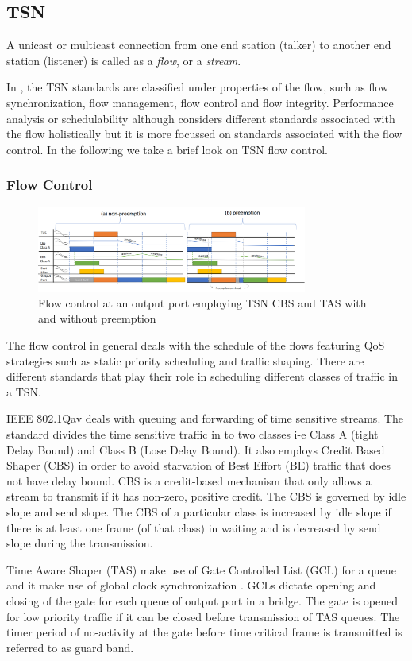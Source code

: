\documentclass[journal,12pt,twocolumn]{IEEEtran}
\begin{document}
\subsection{TSN}
A unicast or multicast connection from one end station (talker) to another end station (listener) is called as a \emph {flow}, or a \emph {stream}.

In \cite{ULL}, the TSN standards are classified under properties of the flow, such as flow synchronization, flow management, flow control and flow integrity. Performance analysis or schedulability although considers different standards associated with the flow holistically but it is more focussed on standards associated with the flow control. In the following we take a brief look on TSN flow control.
\subsubsection{Flow Control}
\begin{figure}
\centering
\includegraphics[width=3.5in]{TSNFlowControl}
\caption{Flow control at an output port employing TSN CBS and TAS with and without preemption}
\label{TSN_FlowControl}
\end{figure}
The flow control in general deals with the schedule of the flows featuring QoS strategies such as static priority scheduling and traffic shaping. There are different standards that play their role in scheduling different classes of traffic in a TSN.

IEEE 802.1Qav \cite{IEEE802.1Qav} deals with queuing and forwarding of time sensitive streams. The standard divides the time sensitive traffic in to two classes i-e Class A (tight Delay Bound) and Class B (Lose Delay Bound). It also employs Credit Based Shaper (CBS) in order to avoid starvation of Best Effort (BE) traffic that does not have delay bound. CBS is a credit-based mechanism that only allows a stream to transmit if it has non-zero, positive credit. The CBS is governed by idle slope and send slope. The CBS of a particular class is increased by idle slope if there is at least one frame (of that class) in waiting and is decreased by send slope during the transmission.

Time Aware Shaper (TAS) \cite{IEEE802.1Qbv} make use of Gate Controlled List (GCL) for a queue and it make use of global clock synchronization \cite{IEEE802.1AS}. GCLs dictate opening and closing of the gate for each queue of output port in a bridge. The gate is opened for low priority traffic if it can be closed before transmission of TAS queues. The timer period of no-activity at the gate before time critical frame is transmitted is referred to as guard band.
\end{document}
